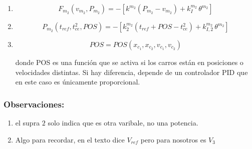 \begin{enumerate}
    \item 
    \begin{equation}
    F_{m_2}(v_{m_2},P_{m_2}) = - \left[ k^{m_2} (P_{m_2} - v_{m_2}) + k^{m_2}_I \, \theta^{m_2} \right]
    \end{equation}

    \item 
    \begin{equation}
    P_{m_2}(t_{ref},t_{ce}^2,POS) =
    - \left[ k^{m_2}_2 (t_{ref} + POS - t_{ce}^2) + k^{m_2}_{I,2} \, \theta^{m_2} \right]
    \end{equation}

    \item 
    \begin{equation}
    POS = POS(x_{c_1},x_{c_2},v_{c_1},v_{c_2})
    \end{equation}

    donde POS es una función que se activa si los carros están en posiciones o velocidades distintas. 
    Si hay diferencia, depende de un controlador PID que en este caso es únicamente proporcional.
\end{enumerate}

\subsubsection*{Observaciones:}
\begin{enumerate}
    \item el supra $2$ solo indica que es otra varibale, no una potencia.
    \item Algo para recordar, en el texto dice $V_{ref}$ pero para nosotros es $V_3$
\end{enumerate}
